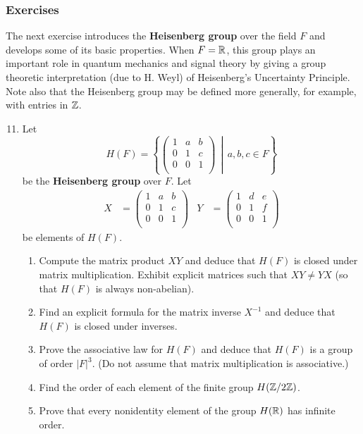 \documentclass[../notes.tex]{subfiles}
\begin{document}
\subsubsection*{Exercises}
The next exercise introduces the \textbf{Heisenberg group} over the field $F$ and develops some of its basic properties. When $F=\mathbb{R}$, this group plays an important role in quantum mechanics and signal theory by giving a group theoretic interpretation (due to H. Weyl) of Heisenberg's Uncertainty Principle. Note also that the Heisenberg group may be defined more generally, for example, with entries in $\mathbb{Z}$.
\begin{enumerate}[label={\textbf{\arabic*.}},ref={1.4.\arabic*}]
    \setcounter{enumi}{10}
    \item \label{exr:1.4.11}Let
    \begin{equation*}
        H(F) = \left\{
            \begin{pmatrix}
                1 & a & b\\
                0 & 1 & c\\
                0 & 0 & 1\\
            \end{pmatrix}
            \,\middle|\, a,b,c\in F
        \right\}
    \end{equation*}
    be the \textbf{Heisenberg group} over $F$. Let
    \begin{align*}
        X &=
        \begin{pmatrix}
            1 & a & b\\
            0 & 1 & c\\
            0 & 0 & 1\\
        \end{pmatrix}&
        Y &=
        \begin{pmatrix}
            1 & d & e\\
            0 & 1 & f\\
            0 & 0 & 1\\
        \end{pmatrix}
    \end{align*}
    be elements of $H(F)$.
    \begin{enumerate}[label={\textbf{(\alph*)}},ref={1.4.11\alph*}]
        \item \label{exr:1.4.11a}Compute the matrix product $XY$ and deduce that $H(F)$ is closed under matrix multiplication. Exhibit explicit matrices such that $XY\neq YX$ (so that $H(F)$ is always non-abelian).
        \item \label{exr:1.4.11b}Find an explicit formula for the matrix inverse $X^{-1}$ and deduce that $H(F)$ is closed under inverses.
        \item \label{exr:1.4.11c}Prove the associative law for $H(F)$ and deduce that $H(F)$ is a group of order $|F|^3$. (Do not assume that matrix multiplication is associative.)
        \item \label{exr:1.4.11d}Find the order of each element of the finite group $H(\mathbb{Z}/2\mathbb{Z})$.
        \item \label{exr:1.4.11e}Prove that every nonidentity element of the group $H(\mathbb{R})$ has infinite order.
    \end{enumerate}
\end{enumerate}
\end{document}

